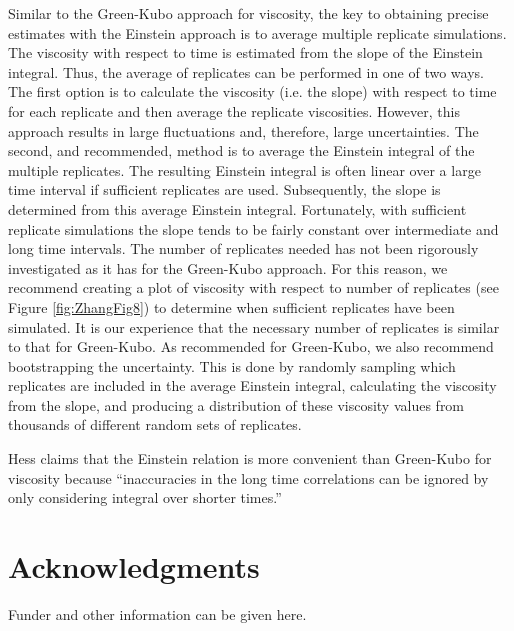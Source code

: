 \documentclass[9pt]{livecoms}
\begin{document}
Similar to the Green-Kubo approach for viscosity, the key to obtaining precise estimates with the Einstein approach is to average multiple replicate simulations. The viscosity with respect to time is estimated from the slope of the Einstein integral. Thus, the average of replicates can be performed in one of two ways. The first option is to calculate the viscosity (i.e. the slope) with respect to time for each replicate and then average the replicate viscosities. However, this approach results in large fluctuations and, therefore, large uncertainties. The second, and recommended, method is to average the Einstein integral of the multiple replicates. The resulting Einstein integral is often linear over a large time interval if sufficient replicates are used. Subsequently, the slope is determined from this average Einstein integral. Fortunately, with sufficient replicate simulations the slope tends to be fairly constant over intermediate and long time intervals. The number of replicates needed has not been rigorously investigated as it has for the Green-Kubo approach. For this reason, we recommend creating a plot of viscosity with respect to number of replicates (see Figure \ref{fig:ZhangFig8}) to determine when sufficient replicates have been simulated. It is our experience that the necessary number of replicates is similar to that for Green-Kubo. As recommended for Green-Kubo, we also recommend bootstrapping the uncertainty. This is done by randomly sampling which replicates are included in the average Einstein integral, calculating the viscosity from the slope, and producing a distribution of these viscosity values from thousands of different random sets of replicates.

Hess claims that the Einstein relation is more convenient than Green-Kubo for viscosity because ``inaccuracies in the long time correlations can be ignored by only considering integral over shorter times.'' 

\section{Acknowledgments}

Funder and other information can be given here.



\end{document}
